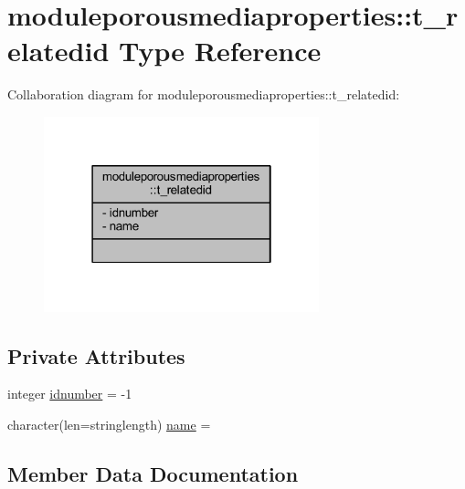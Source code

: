 \hypertarget{structmoduleporousmediaproperties_1_1t__relatedid}{}\section{moduleporousmediaproperties\+:\+:t\+\_\+relatedid Type Reference}
\label{structmoduleporousmediaproperties_1_1t__relatedid}


Collaboration diagram for moduleporousmediaproperties\+:\+:t\+\_\+relatedid\+:\nopagebreak
\begin{figure}[H]
\begin{center}
\leavevmode
\includegraphics[width=226pt]{structmoduleporousmediaproperties_1_1t__relatedid__coll__graph}
\end{center}
\end{figure}
\subsection*{Private Attributes}
\begin{DoxyCompactItemize}
\item 
integer \mbox{\hyperlink{structmoduleporousmediaproperties_1_1t__relatedid_acea7f1b919197d3f12c935c6f6309f3d}{idnumber}} = -\/1
\item 
character(len=stringlength) \mbox{\hyperlink{structmoduleporousmediaproperties_1_1t__relatedid_a9b57cfca7d90b2b423b8bccd8674f20a}{name}} = \textquotesingle{}\textquotesingle{}
\end{DoxyCompactItemize}


\subsection{Member Data Documentation}
\mbox{\label{structmoduleporousmediaproperties_1_1t__relatedid_acea7f1b919197d3f12c935c6f6309f3d}} 
